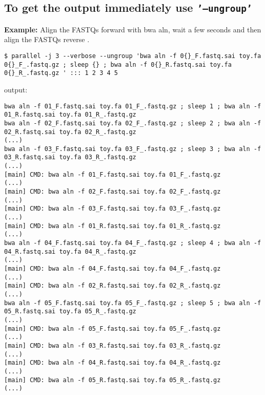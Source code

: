 \documentclass{article}
\newcommand{\example}[1]{
\textbf{Example: } {\color[rgb]{0,0,1} #1 } .
}
\newcommand{\cmdoption}[1]{\texttt{'#1'}}
\begin{document}
\subsection{To get the output immediately use \cmdoption{--ungroup}}
\example{Align the FASTQs forward with bwa aln, wait a few seconds and then align the FASTQs reverse }
\begin{lstlisting}
$ parallel -j 3 --verbose --ungroup 'bwa aln -f 0{}_F.fastq.sai toy.fa 0{}_F_.fastq.gz ; sleep {} ; bwa aln -f 0{}_R.fastq.sai toy.fa 0{}_R_.fastq.gz ' ::: 1 2 3 4 5
\end{lstlisting}
output:
\begin{lstlisting}
bwa aln -f 01_F.fastq.sai toy.fa 01_F_.fastq.gz ; sleep 1 ; bwa aln -f 01_R.fastq.sai toy.fa 01_R_.fastq.gz 
bwa aln -f 02_F.fastq.sai toy.fa 02_F_.fastq.gz ; sleep 2 ; bwa aln -f 02_R.fastq.sai toy.fa 02_R_.fastq.gz 
(...)
bwa aln -f 03_F.fastq.sai toy.fa 03_F_.fastq.gz ; sleep 3 ; bwa aln -f 03_R.fastq.sai toy.fa 03_R_.fastq.gz 
(...)
[main] CMD: bwa aln -f 01_F.fastq.sai toy.fa 01_F_.fastq.gz
(...)
[main] CMD: bwa aln -f 02_F.fastq.sai toy.fa 02_F_.fastq.gz
(...)
[main] CMD: bwa aln -f 03_F.fastq.sai toy.fa 03_F_.fastq.gz
(...)
[main] CMD: bwa aln -f 01_R.fastq.sai toy.fa 01_R_.fastq.gz
(...)
bwa aln -f 04_F.fastq.sai toy.fa 04_F_.fastq.gz ; sleep 4 ; bwa aln -f 04_R.fastq.sai toy.fa 04_R_.fastq.gz 
(...)
[main] CMD: bwa aln -f 04_F.fastq.sai toy.fa 04_F_.fastq.gz
(...)
[main] CMD: bwa aln -f 02_R.fastq.sai toy.fa 02_R_.fastq.gz
(...)
bwa aln -f 05_F.fastq.sai toy.fa 05_F_.fastq.gz ; sleep 5 ; bwa aln -f 05_R.fastq.sai toy.fa 05_R_.fastq.gz 
(...)
[main] CMD: bwa aln -f 05_F.fastq.sai toy.fa 05_F_.fastq.gz
(...)
[main] CMD: bwa aln -f 03_R.fastq.sai toy.fa 03_R_.fastq.gz
(...)
[main] CMD: bwa aln -f 04_R.fastq.sai toy.fa 04_R_.fastq.gz
(...)
[main] CMD: bwa aln -f 05_R.fastq.sai toy.fa 05_R_.fastq.gz
(...)
\end{lstlisting}
\end{document}
